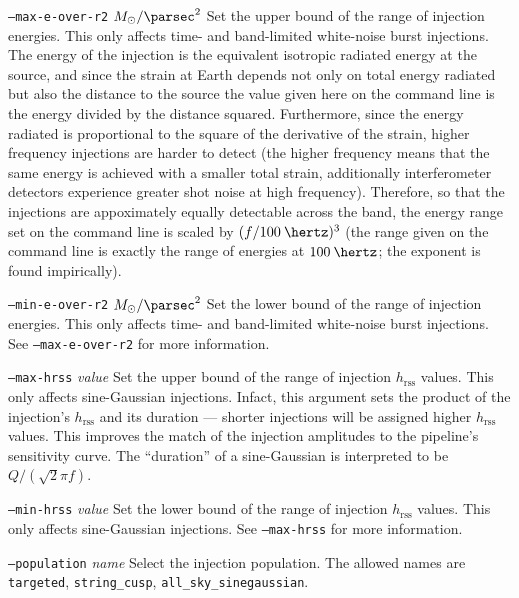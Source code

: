 \documentclass[10pt]{article}
\newcommand{\option}[1]{\texttt{#1}}
\newcommand{\parm}[1]{\textit{#1}}
\newenvironment{entry}%
{\begin{list}{}{\renewcommand{\makelabel}[1]%
{\parbox[b]{\labelwidth}{\makebox[0pt][l]{\textbf{##1}}\\}}%
\setlength{\labelwidth}{1em}%
\setlength{\labelsep}{1em}%
\setlength{\leftmargin}{2em}%
\setlength{\topsep}{\medskipamount}%
\setlength{\itemsep}{\medskipamount}%
\setlength{\parsep}{\medskipamount}%
\setlength{\listparindent}{0pt}}}
{\end{list}}
\begin{document}
\begin{entry}
\begin{entry}
\item[\option{--max-e-over-r2} \parm{\(\Msol / \text{\parsec}^{2}\)}]
Set the upper bound of the range of injection energies.  This only affects
time- and band-limited white-noise burst injections.  The energy of the
injection is the equivalent isotropic radiated energy at the source, and
since the strain at Earth depends not only on total energy radiated but
also the distance to the source the value given here on the command line is
the energy divided by the distance squared.  Furthermore, since the energy
radiated is proportional to the square of the derivative of the strain,
higher frequency injections are harder to detect (the higher frequency
means that the same energy is achieved with a smaller total strain,
additionally interferometer detectors experience greater shot noise at high
frequency).  Therefore, so that the injections are appoximately equally
detectable across the band, the energy range set on the command line is
scaled by \((f / \unit{100}{\hertz})^{3}\) (the range given on the command
line is exactly the range of energies at \(\unit{100}{\hertz}\);  the
exponent is found impirically).

\item[\option{--min-e-over-r2} \parm{\(\Msol / \text{\parsec}^{2}\)}]
Set the lower bound of the range of injection energies.  This only affects
time- and band-limited white-noise burst injections.  See
\option{--max-e-over-r2} for more information.

\item[\option{--max-hrss} \parm{value}]
Set the upper bound of the range of injection \(h_{\text{rss}}\) values.
This only affects sine-Gaussian injections.  Infact, this argument sets the
product of the injection's \(h_{\text{rss}}\) and its duration --- shorter
injections will be assigned higher \(h_{\text{rss}}\) values.  This
improves the match of the injection amplitudes to the pipeline's
sensitivity curve.  The ``duration'' of a sine-Gaussian is interpreted to
be \(Q / (\sqrt{2} \pi f)\).

\item[\option{--min-hrss} \parm{value}]
Set the lower bound of the range of injection \(h_{\text{rss}}\) values.
This only affects sine-Gaussian injections.  See \option{--max-hrss} for
more information.

\item[\option{--population} \parm{name}]
Select the injection population.  The allowed names are \option{targeted},
\option{string\_cusp}, \option{all\_sky\_sinegaussian}.


\end{entry}
\end{entry}
\end{document}
